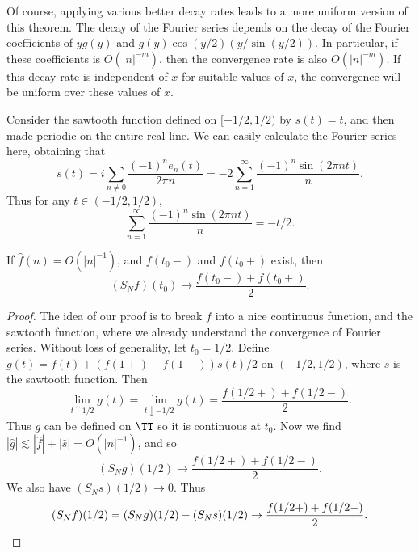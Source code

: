 Of course, applying various better decay rates leads to a more uniform version of this theorem. The decay of the Fourier series depends on the decay of the Fourier coefficients of $yg(y)$ and $g(y) \cos(y/2)(y/\sin(y/2))$. In particular, if these coefficients is $O(|n|^{-m})$, then the convergence rate is also $O(|n|^{-m})$. If this decay rate is independent of $x$ for suitable values of $x$, the convergence will be uniform over these values of $x$.

\begin{example}
    Consider the sawtooth function defined on $[-1/2,1/2)$ by $s(t) = t$, and then made periodic on the entire real line. We can easily calculate the Fourier series here, obtaining that
    \[ s(t) = i \sum_{n \neq 0} \frac{(-1)^n e_n(t)}{2 \pi n} = -2 \sum_{n = 1}^\infty \frac{(-1)^n \sin(2 \pi nt)}{n}. \]
    Thus for any $t \in (-1/2,1/2)$,
    \[ \sum_{n = 1}^\infty \frac{(-1)^n \sin(2 \pi nt)}{n} = -t/2. \]
\end{example}

\begin{theorem}
    If $\widehat{f}(n) = O(|n|^{-1})$, and $f(t_0-)$ and $f(t_0+)$ exist, then
    \[ (S_N f)(t_0) \to \frac{f(t_0-) + f(t_0+)}{2}. \]
\end{theorem}
\begin{proof}
    The idea of our proof is to break $f$ into a nice continuous function, and the sawtooth function, where we already understand the convergence of Fourier series. Without loss of generality, let $t_0 = 1/2$. Define $g(t) = f(t) + (f(1+) - f(1-)) s(t) / 2$ on $(-1/2,1/2)$, where $s$ is the sawtooth function. Then
    \[ \lim_{t \uparrow 1/2} g(t) = \lim_{t \downarrow -1/2} g(t) = \frac{f(1/2+) + f(1/2-)}{2}. \]
    Thus $g$ can be defined on $\TT$ so it is continuous at $t_0$. Now we find $|\widehat{g}| \lesssim |\widehat{f}| + |\widehat{s}| = O(|n|^{-1})$, and so
    \[ (S_N g)(1/2) \to \frac{f(1/2+) + f(1/2-)}{2}. \]
    We also have $(S_N s)(1/2) \to 0$. Thus
    \[ (S_N f)(1/2) = (S_N g)(1/2) - (S_N s)(1/2) \to \frac{f(1/2+) + f(1/2-)}{2}. \qedhere \]
\end{proof}

